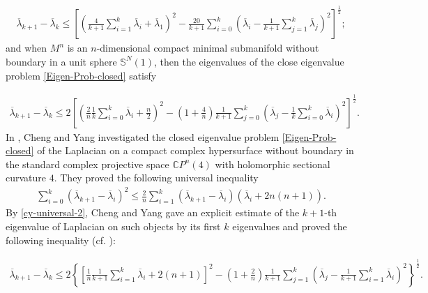 \documentclass[12pt]{article}
\numberwithin{equation}{section}
\begin{document}
\begin{equation*}\begin{aligned}\overline{\lambda}_{k+1}-\overline{\lambda}_{k}\leq\left[\left(
\frac{4}{k+1}\sum^{k}_{i=1}\overline{\lambda}_{i}+\overline{\lambda}_{1}\right)^{2}-\frac{20}{k+1}\sum^{k}_{i=0}\left(\overline{\lambda}_{i}
-\frac{1}{k+1}\sum^{k}_{j=1}\overline{\lambda}_{j}\right)^{2}\right]^{\frac{1}{2}};\end{aligned}
\end{equation*}
and when $M^{n}$ is an $n$-dimensional compact minimal submanifold without boundary in a unit sphere $\mathbb{S}^{N}(1)$, then the eigenvalues of the
close eigenvalue problem \eqref{Eigen-Prob-closed} satisfy

\begin{equation*}\begin{aligned}\overline{\lambda}_{k+1}-\overline{\lambda}_{k}\leq2\left[\left(
\frac{2}{n}\frac{1}{k}\sum^{k}_{i=0}\overline{\lambda}_{i}+\frac{n}{2}\right)^{2}-\left(1+\frac{4}{n}\right)\frac{1}{k+1}\sum^{k}_{j=0}\left(\overline{\lambda}_{j}
-\frac{1}{k}\sum^{k}_{i=0}\overline{\lambda}_{i}\right)^{2}\right]^{\frac{1}{2}}.\end{aligned}
\end{equation*}
In \cite{CY2}, Cheng and Yang
investigated the closed eigenvalue problem \eqref{Eigen-Prob-closed} of the Laplacian on a
compact complex hypersurface without boundary in the standard complex projective space $\mathbb{C}P^{n}(4)$  with holomorphic sectional curvature $4$.
They proved the following universal inequality
\begin{equation}\label{cy-universal-2}\begin{aligned}\sum^{k}_{i=0}\left(\overline{\lambda}_{k+1}-\overline{\lambda}_{i}\right)^{2}\leq\frac{2}{n}
\sum^{k}_{i=1}\left(\overline{\lambda}_{k+1}-\overline{\lambda}_{i}\right)\left(\overline{\lambda}_{i}+2n(n+1)\right).\end{aligned}
\end{equation}
By \eqref{cy-universal-2}, Cheng and Yang gave an explicit
estimate of the $k+1$-th eigenvalue of Laplacian on such objects by its first $k$
eigenvalues and proved the following inequality (cf. \cite{CY2}):

\begin{equation}\label{cylk1-lk-2}\begin{aligned}\overline{\lambda}_{k+1}-\overline{\lambda}_{k}\leq
2\left\{\left[\frac{1}{n}\frac{1}{k+1}\sum^{k}_{i=1}\overline{\lambda}_{i}+2(n+1)\right]^{2}
-\left(1+\frac{2}{n}\right)\frac{1}{k+1}\sum^{k}_{j=1}\left(\overline{\lambda}_{j}-\frac{1}{k+1}\sum^{k}_{i=1}\overline{\lambda}_{i}\right)^{2}\right\}^{\frac{1}{2}}.\end{aligned}
\end{equation}
\end{document}
